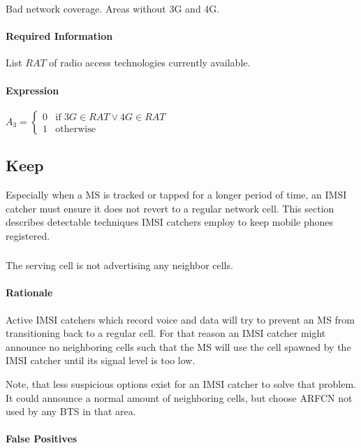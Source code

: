 \documentclass[a4paper,11pt,notitlepage,bigheadings,oneside]{scrartcl}
\begin{document}
Bad network coverage. Areas without 3G and 4G.

\paragraph{Required Information}

List $RAT$ of radio access technologies currently available.

\paragraph{Expression}

$A_3 =
\begin{cases}
	0 & \text{if } 3G \in RAT \vee 4G \in RAT \\
	1 & \text{otherwise}
\end{cases}$

\subsection{Keep}

Especially when a MS is tracked or tapped for a longer period of time, an IMSI
catcher must ensure it does not revert to a regular network cell. This section
describes detectable techniques IMSI catchers employ to keep mobile phones
registered.

\subsubsection{}

The serving cell is not advertising any neighbor cells.

\paragraph{Rationale}

Active IMSI catchers which record voice and data will try to prevent an MS from
transitioning back to a regular cell. For that reason an IMSI catcher might
announce no neighboring cells such that the MS will use the cell spawned by the
IMSI catcher until its signal level is too low.

Note, that less suspicious options exist for an IMSI catcher to solve that
problem. It could announce a normal amount of neighboring cells, but choose
ARFCN not used by any BTS in that area.

\paragraph{False Positives}
\end{document}
